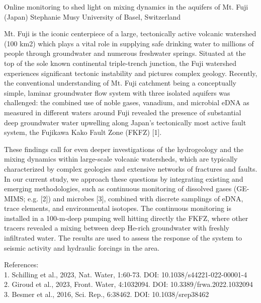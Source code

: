 \begin{conf-abstract}
{Online monitoring to shed light on mixing dynamics in the aquifers of Mt. Fuji (Japan)}
{Stephanie	Musy}
{University of Basel, Switzerland}
{
Mt. Fuji is the iconic centerpiece of a large, tectonically active volcanic watershed (100 km2) which plays a vital role in supplying safe drinking water to millions of people through groundwater and numerous freshwater springs. Situated at the top of the sole known continental triple-trench junction, the Fuji watershed experiences significant tectonic instability and pictures complex geology. Recently, the conventional understanding of Mt. Fuji catchment being a conceptually simple, laminar groundwater flow system with three isolated aquifers was challenged: the combined use of noble gases, vanadium, and microbial eDNA as measured in different waters around Fuji revealed the presence of substantial deep groundwater water upwelling along Japan’s tectonically most active fault system, the Fujikawa Kako Fault Zone (FKFZ) [1].

These findings call for even deeper investigations of the hydrogeology and the mixing dynamics within large-scale volcanic watersheds, which are typically characterized by complex geologies and extensive networks of fractures and faults. In our current study, we approach these questions by integrating existing and emerging methodologies, such as continuous monitoring of dissolved gases (GE-MIMS; e.g. [2]) and microbes [3], combined with discrete samplings of eDNA, trace elements, and environmental isotopes. The continuous monitoring is installed in a 100-m-deep pumping well hitting directly the FKFZ, where other tracers revealed a mixing between deep He-rich groundwater with freshly infiltrated water. The results are used to assess the response of the system to seismic activity and hydraulic forcings in the area. 

References:\\
1. Schilling et al., 2023, Nat. Water, 1:60-73. DOI: 10.1038/s44221-022-00001-4\\
2. Giroud et al., 2023, Front. Water, 4:1032094. DOI: 10.3389/frwa.2022.1032094\\
3. Besmer et al., 2016, Sci. Rep., 6:38462. DOI: 10.1038/srep38462
}
\end{conf-abstract}



